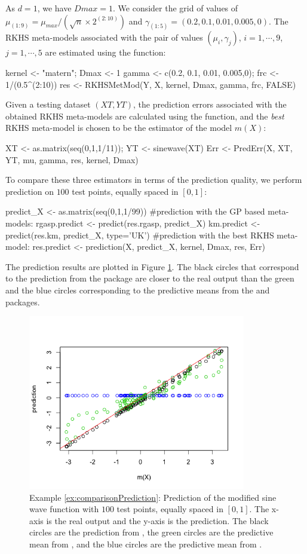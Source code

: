 As $d=1$, we have $Dmax=1$. We consider the grid of values of $\mu_{(1:9)}=\mu_{max}/(\sqrt{n}\times 2^{(2:10)})$ and $\gamma_{(1:5)}=(0.2,0.1,0.01,0.005,0)$.
The RKHS meta-models associated with the pair of values $(\mu_i,\gamma_j)$, $i = 1,\cdots,9$, $j=1,\cdots,5$ are estimated using the  function:
\begin{example}
kernel <- "matern"; Dmax <- 1 
gamma <- c(0.2, 0.1, 0.01, 0.005,0); frc <- 1/(0.5^(2:10))
res <- RKHSMetMod(Y, X, kernel, Dmax, gamma, frc, FALSE)
\end{example}
Given a testing dataset $(XT,YT)$, the prediction errors associated with the obtained RKHS meta-models are calculated using the  function, and the \textit{best} RKHS meta-model is chosen to be the estimator of the model $m(X)$:
\begin{example}
XT <- as.matrix(seq(0,1,1/11)); YT <- sinewave(XT)
Err <- PredErr(X, XT, YT, mu, gamma, res, kernel, Dmax)
\end{example}
To compare these three estimators in terms of the prediction quality, we perform prediction on $100$ test points, equally spaced in $[0,1]$:
\begin{example}
predict_X <- as.matrix(seq(0,1,1/99))
#prediction with the GP based meta-models:
rgasp.predict <- predict(res.rgasp, predict_X)
km.predict <- predict(res.km, predict_X, type='UK')
#prediction with the best RKHS meta-model:
res.predict <- prediction(X, predict_X, kernel, Dmax, res, Err) 
\end{example}
The prediction results are plotted in Figure \ref{Rplot01ex6}. The black circles that correspond to the prediction from the  package are closer to the real output than the green and the blue circles corresponding to the predictive means from the  and  packages.
\begin{figure}[h!]
  \centering
  \includegraphics[width=9.5cm]{Rplot01ex6.png}
  \caption{Example \ref{ex:comparisonPrediction}: Prediction of the modified sine wave function with $100$ test points, equally spaced in $[0,1]$. The x-axis is the real output and the y-axis is the prediction. The black circles are the prediction from , the green circles are the predictive mean from , and the blue circles are the predictive mean from .}
  \label{Rplot01ex6}
\end{figure}
